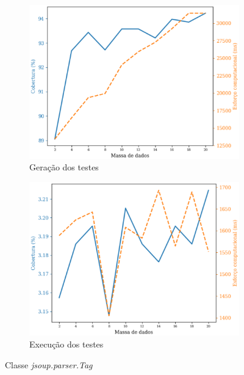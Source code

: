 

\begin{figure}[H]
    \centering
    \begin{subfigure}{.5\textwidth}
        \centering
        \includegraphics[scale=0.5]{figuras/jsoup.parser.tag_generation.eps}
        \caption{Geração dos testes}
        \label{fig:genJsoupTag}
    \end{subfigure}%
    \begin{subfigure}{.5\textwidth}
        \centering
        \includegraphics[scale=0.5]{figuras/jsoup.parser.tag_execution.eps}
        \caption{Execução dos testes}
        \label{fig:execJsoupTag}
    \end{subfigure}
    \caption{Classe \textit{jsoup.parser.Tag}}
\label{fig:test}
\end{figure}

